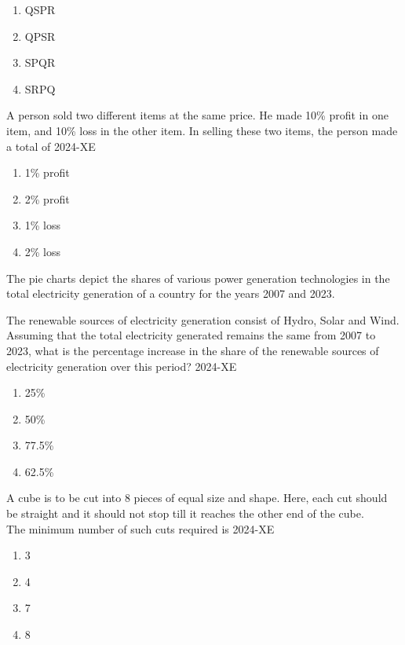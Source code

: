 	\begin{enumerate}
		\item QSPR
		\item QPSR
		\item SPQR
		\item SRPQ
	\end{enumerate}

\item A person sold two different items at the same price. He made 10\% profit in one item, and 10\% loss in the other item. In selling these two items, the person made a total of
\hfill{2024-XE}

	\begin{enumerate}
		\item 1\% profit
		\item 2\% profit
		\item 1\% loss
		\item 2\% loss
	\end{enumerate}

\item The pie charts depict the shares of various power generation technologies in the total electricity generation of a country for the years 2007 and 2023. \\
	\begin{figure}[ht]
		\centering
		
	\end{figure}
The renewable sources of electricity generation consist of Hydro, Solar and Wind. Assuming that the total electricity generated remains the same from 2007 to 2023, what is the percentage increase in the share of the renewable sources of electricity generation over this period?
\hfill{2024-XE}

	\begin{enumerate}
		\item 25\%
		\item 50\%
		\item 77.5\%
		\item 62.5\%
	\end{enumerate}

\item A cube is to be cut into 8 pieces of equal size and shape. Here, each cut should be straight and it should not stop till it reaches the other end of the cube. \\
The minimum number of such cuts required is
\hfill{2024-XE}

		\begin{enumerate}
			\item 3
			\item 4
			\item 7
			\item 8
		\end{enumerate}


